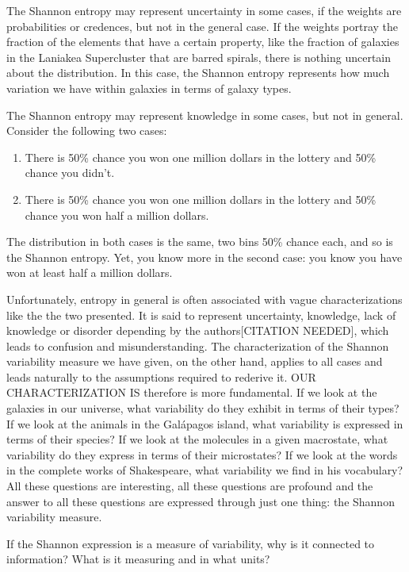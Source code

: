 \documentclass{article}
\begin{document}
The Shannon entropy may represent uncertainty in some cases, if the weights are probabilities or credences, but not in the general case. If the weights portray the fraction of the elements that have a certain property, like the fraction of galaxies in the Laniakea Supercluster that are barred spirals, there is nothing uncertain about the distribution. In this case, the Shannon entropy represents how much variation we have within galaxies in terms of galaxy types.

The Shannon entropy may represent knowledge in some cases, but not in general. Consider the following two cases:
\begin{enumerate}
\item There is 50\% chance you won one million dollars in the lottery and 50\% chance you didn't.
\item There is 50\% chance you won one million dollars in the lottery and 50\% chance you won half a million dollars.
\end{enumerate}
The distribution in both cases is the same, two bins 50\% chance each, and so is the Shannon entropy. Yet, you know more in the second case: you know you have won at least half a million dollars.

Unfortunately, entropy in general is often associated with vague characterizations like the the two presented. It is said to represent uncertainty, knowledge, lack of knowledge or disorder depending by the authors[CITATION NEEDED], which leads to confusion and misunderstanding.  The characterization of the Shannon variability measure we have given, on the other hand, applies to all cases and leads naturally to the assumptions required to rederive it. OUR CHARACTERIZATION IS therefore is more fundamental. If we look at the galaxies in our universe, what variability do they exhibit in terms of their types? If we look at the animals in the Gal\'{a}pagos island, what variability is expressed in terms of their species? If we look at the molecules in a given macrostate, what variability do they express in terms of their microstates? If we look at the words in the complete works of Shakespeare, what variability we find in his vocabulary? All these questions are interesting, all these questions are profound and the answer to all these questions are expressed through just one thing: the Shannon variability measure.

If the Shannon expression is a measure of variability, why is it connected to information? What is it measuring and in what units?
\end{document}
